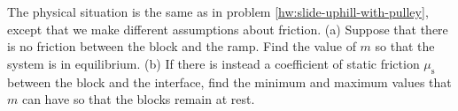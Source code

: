 The physical situation is the same as in problem \ref{hw:slide-uphill-with-pulley},
except that we make different assumptions about friction.
%
(a) Suppose that there is no friction between the block and the ramp.
Find the value of $m$ so that the system is in equilibrium.\hwendpart
%
(b) If there is instead a coefficient of static friction $\mu_\text{s}$
between the block and the interface, find the minimum and maximum
values that $m$ can have so that the blocks remain at rest.
